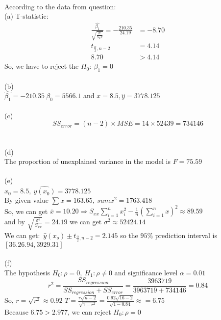 \documentclass[11pt]{article}
\begin{document}
  \paragraph{\color{red}{Question Three Answer:}} According to the data from question: \\
  (a)
    T-statistic:
    \begin{align*}
      \frac{\hat{\beta_1}}{\sqrt{\frac{\sigma^2}{S_xx}}} = -\frac{210.35}{24.19} &= - 8.70 \\
      t_{\frac{\alpha}{2}, n-2} &= 4.14 \\
      8.70 &> 4.14
    \end{align*}
    So, we have to reject the $H_0:\ \beta_1 = 0$
  \\
  \\
  (b) \\
    $\hat{\beta_1} = -210.35 \ \hat{\beta_0} = 5566.1$ and $x = 8.5, \hat{y} = 3778.125$
  \\
  \\
  (c) \\
  $$
  SS_{error} = (n-2)\times MSE = 14 \times 52439 = 734146
  $$
  \\
  \\
  (d) \\
  The proportion of unexplained variance in the model is $F = 75.59$
  \\
  \\
  (e) \\
  $x_0 = 8.5,\ \hat{y(x_0)} = 3778.125$\\
  By given value $\sum x = 163.65, \ sum x^2 = 1763.418$\\
  So, we can get $\displaystyle \overline{x} = 10.20 \Rightarrow S_{xx} \sum_{i=1}^n x_i^2 - \frac{1}{n}(\sum_{i=1}^n x)^2 \approx 89.59$ \\
  and by $\sqrt{\frac{\sigma^2}{S_{xx}}} = 24.19$ we can get $\sigma^2 \approx 52424.14$\\
  We can get:\ $\hat{y}(x_o) \pm t_{\frac{\alpha}{2}, n-2} = 2.145$ so the $95\%$ prediction interval is $[36.26.94,3929.31]$
  \\
  \\
  (f) \\
  The hypothesis $H_0:\rho = 0, \ H_1: \rho \neq 0$ and significance level $\alpha = 0.01$ \\
  $$
    r^2 = \frac{SS_{regression}}{SS_{regression} + SS_{error}} = \frac{3963719}{3963719 + 734146} = 0.84
  $$
  So, $r = \sqrt{r^2} \approx 0.92$ $T = \frac{r\sqrt{n-2}}{\sqrt{1-r^2}} = \frac{0.92\sqrt{16-2}}{\sqrt{1-0.84}} \approx = 6.75$ \\
  Because $6.75 > 2.977$, we can reject $H_0: \rho = 0$
\end{document}
